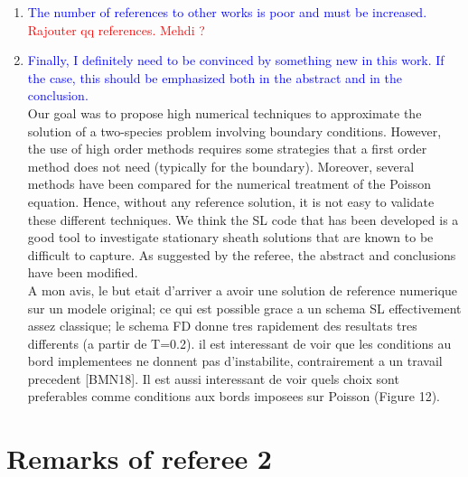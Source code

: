 \documentclass{article}
\begin{document}
\begin{enumerate}
    \item \textcolor{blue}{The number of references to other works is poor and must be increased. }\\
 \textcolor{red}{Rajouter qq references. Mehdi ?}\\ 
    \item \textcolor{blue}{Finally, I definitely need to be convinced by something new in this work. If the case, this
should be emphasized both in the abstract and in the conclusion. }\\
Our goal was to propose high numerical techniques to approximate the solution of a two-species problem involving boundary conditions. 
However, the use of high order methods requires some strategies that a first order method does not need (typically for the boundary). 
Moreover, several methods have been compared for the numerical treatment of the Poisson equation. 
Hence, without any reference solution, it is not easy to validate these different techniques.  We think the SL code 
that has been developed is a good tool to investigate stationary sheath solutions that are known to be difficult to capture.  
As suggested by the referee, the abstract and conclusions have been modified. \\
     {\small A mon avis, le but etait d'arriver a avoir une solution de reference numerique sur un modele original; ce qui est possible grace a un schema SL effectivement assez classique; 
le schema FD donne tres rapidement des resultats tres differents (a partir de T=0.2). il est interessant de voir que les
conditions au bord implementees ne donnent pas d'instabilite, contrairement a un travail precedent [BMN18]. Il est  aussi interessant de voir quels choix sont preferables comme conditions aux bords imposees sur Poisson (Figure 12).}
\end{enumerate}

\bigskip 

\section{Remarks of referee 2}
\end{document}
